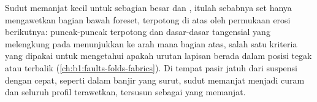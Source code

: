 Sudut memanjat kecil untuk sebagian besar  dan , itulah sebabnya set hanya mengawetkan bagian bawah foreset, terpotong di atas oleh permukaan erosi berikutnya: puncak-puncak terpotong dan dasar-dasar tangensial yang melengkung pada  menunjukkan ke arah mana bagian atas, salah satu kriteria yang dipakai untuk mengetahui apakah urutan lapisan berada dalam posisi tegak atau terbalik (\cref{ch:b1:faults-folds-fabrics}). Di tempat pasir jatuh dari suspensi dengan cepat, seperti dalam banjir yang surut, sudut memanjat menjadi curam dan seluruh profil  terawetkan, tersusun sebagai  yang memanjat.

